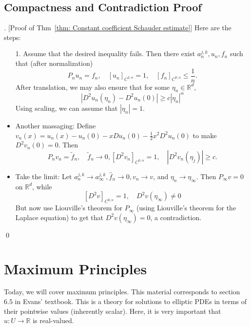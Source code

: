 \subsection{Compactness and Contradiction Proof}
\vspace{2em}
\begin{proof}[][Proof of Thm~\ref{thm: Constant coefficient Schauder estimate}]
    Here are the steps: 
    \begin{itemize}
        \item [1.] Assume that the desired inequality fails. Then there exist $a_{n}^{j, k}, u_{n}, f_{n}$ such that (after normalization)
        $$
        P_{n} u_{n}=f_{n}, \quad\left[u_{n}\right]_{C^{2, \alpha}}=1, \quad\left[f_{n}\right]_{C^{0, \alpha}} \leq \frac{1}{n} .
        $$
        After translation, we may also ensure that for some $\eta_{n} \in \mathbb{R}^{d}$,
        $$
        \left|D^{2} u_{n}\left(\eta_{n}\right)-D^{2} u_{n}(0)\right| \geq c\left|\eta_{n}\right|^{\alpha}
        $$
        Using scaling, we can assume that $\left|\eta_{n}\right|=1$.
        \item  
        Another massaging: Define $v_{n}(x)=u_{n}(x)-u_{n}(0)-x D u_{n}(0)-\frac{1}{2} x^{2} D^{2} u_{n}(0)$ to make $D^{2} v_{n}(0)=0$. Then
        $$
        P_{n} v_{n}=\tilde f_{n}, \quad \tilde{f}_{n} \rightarrow 0,\left[D^{2} v_{n}\right]_{C^{0, \alpha}}=1, \quad\left|D^{2} v_{n}\left(\eta_{j}\right)\right| \geq c .
        $$
        \item 
        Take the limit: Let $a_{n}^{j, k} \rightarrow a_{\infty}^{j, k}, \widehat{f}_{n} \rightarrow 0, v_{n} \rightarrow v$, and $\eta_{n} \rightarrow \eta_{\infty}$. Then $P_{\infty} v=0$ on $\mathbb{R}^{d}$, while
        $$
        \left[D^{2} v\right]_{C^{0, \alpha}} = 1, \quad D^{2} v\left(\eta_{\infty}\right) \neq 0
        $$
        But now use Liouville's theorem for $P_{\infty}$ (using Liouville's theorem for the Laplace equation) to get that $D^{2} v\left(\eta_{\infty}\right)=0$, a contradiction.
    \end{itemize}
\qed
\end{proof}



\newpage
\section{Maximum Principles}
Today, we will cover maximum principles. This material corresponds to section $6.5$ in Evans' textbook. This is a theory for solutions to elliptic PDEs in terms of their pointwise values (inherently scalar). Here, it is very important that $u: U \rightarrow \mathbb{R}$ is real-valued.

